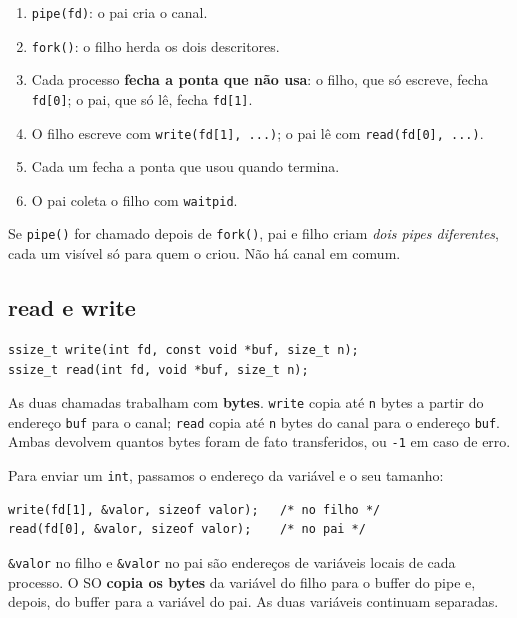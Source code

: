 \documentclass[11pt,a4paper]{article}
\newcommand{\cmd}[1]{\texttt{#1}}
\begin{document}
\begin{enumerate}
    \item \cmd{pipe(fd)}: o pai cria o canal.
    \item \cmd{fork()}: o filho herda os dois descritores.
    \item Cada processo \textbf{fecha a ponta que não usa}: o filho, que só escreve, fecha \cmd{fd[0]}; o pai, que só lê, fecha \cmd{fd[1]}.
    \item O filho escreve com \cmd{write(fd[1], ...)}; o pai lê com \cmd{read(fd[0], ...)}.
    \item Cada um fecha a ponta que usou quando termina.
    \item O pai coleta o filho com \cmd{waitpid}.
\end{enumerate}

\begin{alerta}
Se \cmd{pipe()} for chamado depois de \cmd{fork()}, pai e filho criam \emph{dois pipes diferentes}, cada um visível só para quem o criou. Não há canal em comum.
\end{alerta}

\subsection{read e write}

\begin{lstlisting}[style=codigo]
ssize_t write(int fd, const void *buf, size_t n);
ssize_t read(int fd, void *buf, size_t n);
\end{lstlisting}

As duas chamadas trabalham com \textbf{bytes}. \cmd{write} copia até \cmd{n} bytes a partir do endereço \cmd{buf} para o canal; \cmd{read} copia até \cmd{n} bytes do canal para o endereço \cmd{buf}. Ambas devolvem quantos bytes foram de fato transferidos, ou \cmd{-1} em caso de erro.

Para enviar um \cmd{int}, passamos o endereço da variável e o seu tamanho:

\begin{lstlisting}[style=codigo]
write(fd[1], &valor, sizeof valor);   /* no filho */
read(fd[0], &valor, sizeof valor);    /* no pai */
\end{lstlisting}

\begin{definicao}
\cmd{\&valor} no filho e \cmd{\&valor} no pai são endereços de variáveis locais de cada processo. O SO \textbf{copia os bytes} da variável do filho para o buffer do pipe e, depois, do buffer para a variável do pai. As duas variáveis continuam separadas.
\end{definicao}
\end{document}
